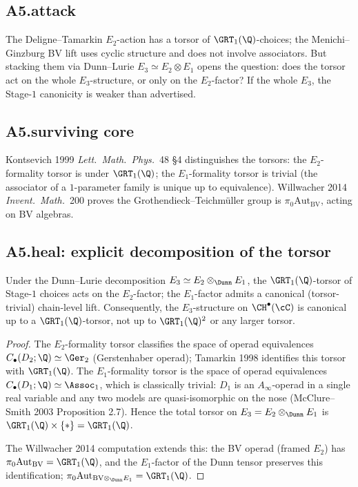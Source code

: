 \subsection*{A5.attack}

The Deligne--Tamarkin $E_2$-action has a torsor of $\GRT_1(\Q)$-choices;
the Menichi--Ginzburg BV lift uses cyclic structure and does not
involve associators. But stacking them via Dunn--Lurie $E_3\simeq
E_2\otimes E_1$ opens the question: does the torsor act on the whole
$E_3$-structure, or only on the $E_2$-factor? If the whole $E_3$, the
Stage-$1$ canonicity is weaker than advertised.

\subsection*{A5.surviving core}

Kontsevich 1999 \emph{Lett.\ Math.\ Phys.}\ 48 \S 4 distinguishes the
torsors: the $E_2$-formality torsor is under $\GRT_1(\Q)$; the
$E_1$-formality torsor is trivial (the associator of a $1$-parameter
family is unique up to equivalence). Willwacher 2014 \emph{Invent.\
Math.}\ 200 proves the Grothendieck--Teichm\"uller group is
$\pi_0\mathrm{Aut}_{\mathrm{BV}}$, acting on BV algebras.

\subsection*{A5.heal: explicit decomposition of the torsor}

\begin{proposition}[$\GRT_1(\Q)$-torsor acts on the $E_2$-factor only]
\label{wave-cfg-prop:grt1-on-e2-only}
Under the Dunn--Lurie decomposition $E_3\simeq E_2\otimes_\Dunn E_1$,
the $\GRT_1(\Q)$-torsor of Stage-$1$ choices acts on the $E_2$-factor;
the $E_1$-factor admits a canonical (torsor-trivial) chain-level
lift. Consequently, the $E_3$-structure on $\CH^\bullet(\cC)$ is
canonical up to a $\GRT_1(\Q)$-torsor, not up to $\GRT_1(\Q)^2$ or
any larger torsor.
\end{proposition}

\begin{proof}
The $E_2$-formality torsor classifies the space of operad equivalences
$C_\bullet(D_2;\Q)\simeq\Ger_2$ (Gerstenhaber operad); Tamarkin 1998
identifies this torsor with $\GRT_1(\Q)$. The $E_1$-formality torsor
is the space of operad equivalences $C_\bullet(D_1;\Q)\simeq\Assoc_1$,
which is classically trivial: $D_1$ is an $A_\infty$-operad in a
single real variable and any two models are quasi-isomorphic on the
nose (McClure--Smith 2003 Proposition 2.7). Hence the total torsor on
$E_3=E_2\otimes_\Dunn E_1$ is $\GRT_1(\Q)\times\{*\}=\GRT_1(\Q)$.

The Willwacher 2014 computation extends this: the BV operad (framed
$E_2$) has $\pi_0\mathrm{Aut}_\mathrm{BV}=\GRT_1(\Q)$, and the
$E_1$-factor of the Dunn tensor preserves this identification;
$\pi_0\mathrm{Aut}_{\mathrm{BV}\otimes_\Dunn E_1}=\GRT_1(\Q)$.
\end{proof}

